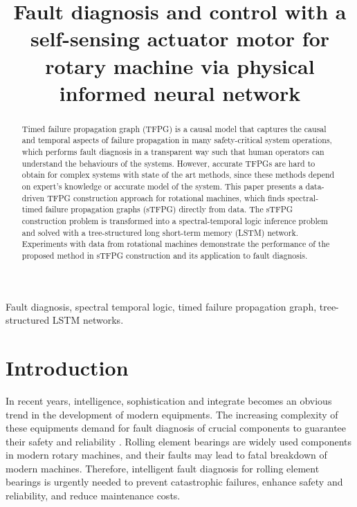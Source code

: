 \documentclass[journal]{IEEEtran}
\theoremstyle{definition}
\begin{document}
\title{Fault diagnosis and control with a self-sensing actuator motor for rotary machine via physical informed neural network}
%
%		
%		
% 

\maketitle
	
\begin{abstract}
Timed failure propagation graph (TFPG) is a causal model that captures the causal and temporal aspects of failure propagation in many safety-critical system operations, which performs fault diagnosis in a transparent way such that human operators can understand the behaviours of the systems. However, accurate TFPGs are hard to obtain for complex systems with state of the art methods, since these methods depend on expert's knowledge or accurate model of the system. This paper presents a data-driven TFPG construction approach for rotational machines, which finds   spectral-timed failure propagation graphs (sTFPG) directly from data. The sTFPG construction problem is transformed into a spectral-temporal logic inference problem and solved with a tree-structured long short-term memory (LSTM) network. Experiments with data from rotational machines demonstrate the performance of the proposed method in sTFPG construction and its application to fault diagnosis.
\end{abstract}

\begin{IEEEkeywords}
Fault diagnosis,  spectral temporal logic, timed failure propagation graph, tree-structured LSTM networks.
\end{IEEEkeywords}

%
{}



\section{Introduction}
In recent years, intelligence, sophistication and integrate becomes an obvious trend in the development of modern equipments. The increasing  complexity of these equipments demand for fault diagnosis of crucial components to guarantee their safety and reliability \cite{haidong2018intelligent}.  Rolling element bearings are widely used components in modern rotary machines, and their faults may lead to fatal breakdown of modern machines. Therefore, intelligent fault diagnosis for rolling element bearings is urgently needed to prevent catastrophic failures, enhance safety and reliability, and reduce maintenance costs.   
\end{document}
